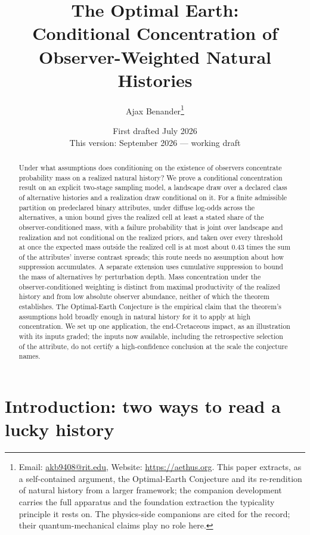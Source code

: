 \documentclass[11pt]{article}
\title{The Optimal Earth:\\ \large Conditional Concentration of Observer-Weighted Natural Histories}
\author{Ajax Benander\thanks{Email: \href{mailto:akb9408@rit.edu}{akb9408@rit.edu}, Website: \url{https://aethus.org}. This paper extracts, as a self-contained argument, the Optimal-Earth Conjecture and its re-rendition of natural history from a larger framework; the companion development \cite{Nexus} carries the full apparatus and the foundation extraction \cite{NexicFoundation} the typicality principle it rests on. The physics-side companions \cite{Aethus, AethusBrief} are cited for the record; their quantum-mechanical claims play no role here.}}
\date{First drafted July 2026\\ {\small This version: September 2026 --- working draft}}
\theoremstyle{definition}
\begin{document}
\maketitle

\begin{abstract}
Under what assumptions does conditioning on the existence of observers concentrate probability mass on a realized natural history? We prove a conditional concentration result on an explicit two-stage sampling model, a landscape draw over a declared class of alternative histories and a realization draw conditional on it. For a finite admissible partition on predeclared binary attributes, under diffuse log-odds across the alternatives, a union bound gives the realized cell at least a stated share of the observer-conditioned mass, with a failure probability that is joint over landscape and realization and not conditional on the realized priors, and taken over every threshold at once the expected mass outside the realized cell is at most about $0.43$ times the sum of the attributes' inverse contrast spreads; this route needs no assumption about how suppression accumulates. A separate extension uses cumulative suppression to bound the mass of alternatives by perturbation depth. Mass concentration under the observer-conditioned weighting is distinct from maximal productivity of the realized history and from low absolute observer abundance, neither of which the theorem establishes. The Optimal-Earth Conjecture is the empirical claim that the theorem's assumptions hold broadly enough in natural history for it to apply at high concentration. We set up one application, the end-Cretaceous impact, as an illustration with its inputs graded; the inputs now available, including the retrospective selection of the attribute, do not certify a high-confidence conclusion at the scale the conjecture names.
\end{abstract}


\section{Introduction: two ways to read a lucky history}
\label{sec:intro}
\end{document}
